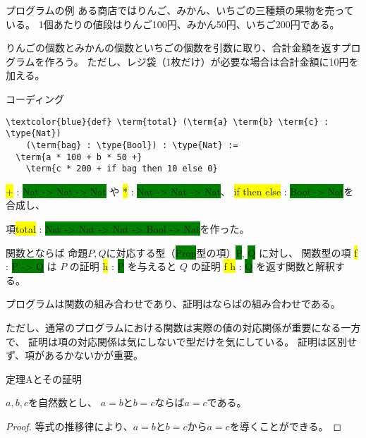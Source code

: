 \documentclass[unicode,12pt]{beamer}%
\newcommand{\type}[1]{\colorbox{green}{#1}}
\newcommand{\term}[1]{\colorbox{yellow}{#1}}
\begin{document}
\begin{frame}{プログラムの例}
  ある商店ではりんご、みかん、いちごの三種類の果物を売っている。
  1個あたりの値段はりんご100円、みかん50円、いちご200円である。

  りんごの個数とみかんの個数といちごの個数を引数に取り、合計金額を返すプログラムを作ろう。
  ただし、レジ袋（1枚だけ）が必要な場合は合計金額に10円を加える。
\end{frame}

\begin{frame}[fragile]{コーディング}
  \begin{tcolorbox}[title=SecondTheorems.lean]
  \setlength{\baselineskip}{12pt}
  \begin{Verbatim}[commandchars=\\\{\}, baselinestretch=1.5]
\textcolor{blue}{def} \term{total} (\term{a} \term{b} \term{c} : \type{Nat})
    (\term{bag} : \type{Bool}) : \type{Nat} :=
  \term{a * 100 + b * 50 +}
    \term{c * 200 + if bag then 10 else 0}
  \end{Verbatim}
  \end{tcolorbox}

  \term{+} : \type{Nat -> Nat -> Nat} や \term{*} : \type{Nat -> Nat -> Nat}、
  \term{if then else} : \type{Bool -> Nat}を合成し、

  項\term{total} : \type{Nat -> Nat -> Nat -> Bool -> Nat}を作った。
\end{frame}

\begin{frame}{関数とならば}
  命題$P, Q$に対応する型（\type{Prop}型の項）\type{P}, \type{Q} に対し、
  関数型の項 \term{f} : \type{P -> Q} は $P$ の証明 \term{h} : \type{P} を与えると $Q$ の証明 \term{f h} : \type{Q} を返す関数と解釈する。  

  プログラムは関数の組み合わせであり、証明はならばの組み合わせである。

  ただし、通常のプログラムにおける関数は実際の値の対応関係が重要になる一方で、
  証明は項の対応関係は気にしないで型だけを気にしている。
  証明は区別せず、項があるかないかが重要。
\end{frame}

\begin{frame}{定理Aとその証明}
  \begin{theorem}
    $a, b, c$を自然数とし、
    $a=b$と$b=c$ならば$a=c$である。
  \end{theorem}

  \begin{proof}
    等式の推移律により、$a=b$と$b=c$から$a=c$を導くことができる。    
  \end{proof}
\end{frame}
\end{document}
